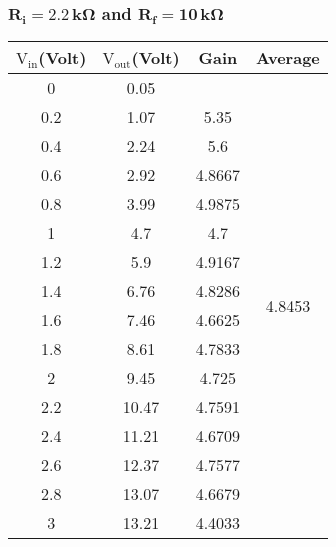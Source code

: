 \documentclass[12pt]{article}
\begin{document}
\subsubsection{$\mathbf{R_i = 2.2\, k \Omega}$ and $\mathbf{R_f = 10\, k \Omega}$}
\begin{table}[H]
	\centering
	\begin{tabular}{|c|c|c|c|}
		\hline
		$\mathrm{V_{in}}$(Volt) & $\mathrm{V_{out}}$(Volt) & Gain             & Average                            \\ \hline \hline
		0            & 0.05          &        & \multirow{16}{*}{4.8453} \\ \cline{1-3}
		0.2          & 1.07          & 5.35   &                          \\ \cline{1-3}
		0.4          & 2.24          & 5.6    &                          \\ \cline{1-3}
		0.6          & 2.92          & 4.8667 &                          \\ \cline{1-3}
		0.8          & 3.99          & 4.9875 &                          \\ \cline{1-3}
		1            & 4.7           & 4.7    &                          \\ \cline{1-3}
		1.2          & 5.9           & 4.9167 &                          \\ \cline{1-3}
		1.4          & 6.76          & 4.8286 &                          \\ \cline{1-3}
		1.6          & 7.46          & 4.6625 &                          \\ \cline{1-3}
		1.8          & 8.61          & 4.7833 &                          \\ \cline{1-3}
		2            & 9.45          & 4.725  &                          \\ \cline{1-3}
		2.2          & 10.47         & 4.7591 &                          \\ \cline{1-3}
		2.4          & 11.21         & 4.6709 &                          \\ \cline{1-3}
		2.6          & 12.37         & 4.7577 &                          \\ \cline{1-3}
		2.8          & 13.07         & 4.6679 &                          \\ \cline{1-3}
		3            & 13.21         & 4.4033 &                          \\ \hline
	\end{tabular}
\end{table}
\end{document}
